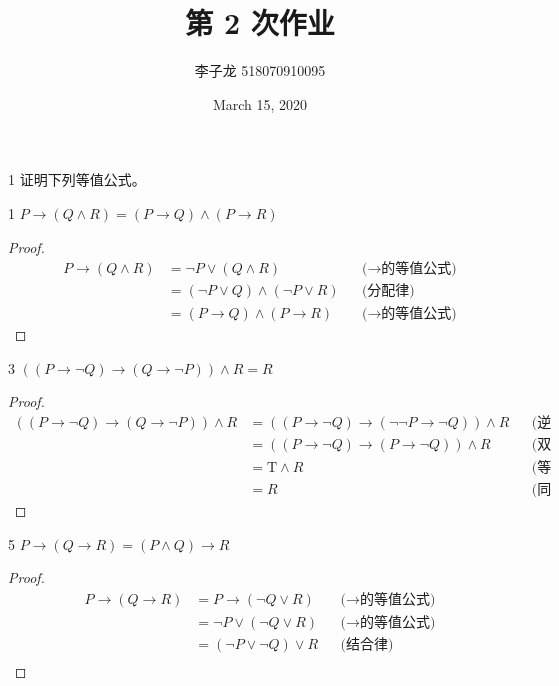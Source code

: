 \documentclass[12pt]{article}
\title{第 2 次作业}
\author{李子龙 518070910095}
\date{March 15, 2020}
\newenvironment{firstlayer}%
{\begin{list}{}{\renewcommand{\makelabel}[1]{\textbf{##1}.\hfil}
}}
{\end{list}}
\newenvironment{secondlayer}%
{\begin{list}{}{\renewcommand{\makelabel}[1]{(##1)\hfil}
}}
{\end{list}}
\begin{document}
\begin{CJK}{UTF8}{gbsn}

\maketitle

\begin{firstlayer}
\item[1] 证明下列等值公式。
    \begin{secondlayer}
    \item[1] $P\rightarrow (Q\wedge R)=(P\rightarrow Q)\wedge (P\rightarrow R)$
    \begin{proof}
      \begin{align*}
        P\rightarrow (Q\wedge R)&= \neg P\vee (Q\wedge R) &&\text{($\rightarrow$的等值公式)} \\
        &=(\neg P \vee Q)\wedge(\neg P \vee R) &&\text{(分配律)} \\
        &=(P\rightarrow Q)\wedge (P\rightarrow R) &&\text{($\rightarrow$的等值公式)}
      \end{align*}
    \end{proof}
    \item[3] $((P\rightarrow \neg Q)\rightarrow (Q\rightarrow \neg P))\wedge R=R$
    \begin{proof}
      \begin{align*}
        ((P\rightarrow \neg Q)\rightarrow (Q\rightarrow \neg P))\wedge R&=((P\rightarrow \neg Q)\rightarrow (\neg \neg P\rightarrow \neg Q))\wedge R &&\text{(逆否定理)} \\
        &=((P\rightarrow \neg Q)\rightarrow (P\rightarrow \neg Q))\wedge R &&\text{(双重否定)}\\
        &=\text{T}\wedge R &&\text{(等幂律)}\\
        &=R &&\text{(同一律)}
      \end{align*}
    \end{proof}
    \item[5] $P\rightarrow (Q\rightarrow R) = (P\wedge Q)\rightarrow R$
    \begin{proof}
      \begin{align*}
        P\rightarrow (Q\rightarrow R)&=P\rightarrow (\neg Q\vee R)&&\text{($\rightarrow$的等值公式)} \\
        & =\neg P\vee (\neg Q\vee R) &&\text{($\rightarrow$的等值公式)} \\
        & =(\neg P\vee \neg Q)\vee R &&\text{(结合律)}\\

\end{align*}
\end{proof}
\end{secondlayer}
\end{firstlayer}
\end{CJK}
\end{document}
